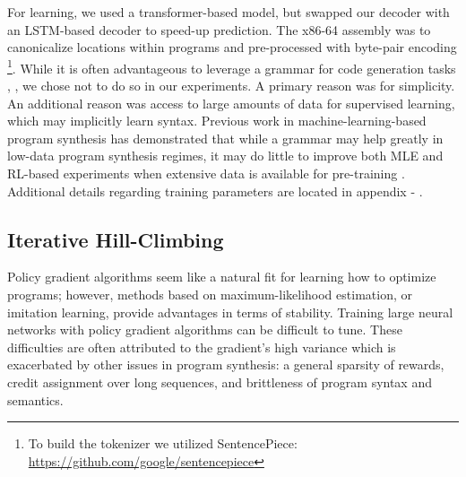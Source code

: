 \documentclass{article}
\begin{document}
For learning, we used a transformer-based model, but swapped our decoder with an LSTM-based decoder to speed-up prediction. 
The x86-64 assembly was to canonicalize locations within programs and pre-processed  with byte-pair encoding \citep{sennrich2015neural} \footnote{To build the tokenizer we utilized SentencePiece: \url{https://github.com/google/sentencepiece}}. 
While it is often advantageous to leverage a grammar for code generation tasks \cite{yin-neubig-2017-syntactic}, \cite{parisotto2016neuro}, we chose not to do so in our experiments. A primary reason was for simplicity. An additional reason was access to large amounts of data for supervised learning, which may implicitly learn syntax. Previous work in machine-learning-based program synthesis has demonstrated that while a grammar may help greatly in low-data program synthesis regimes, it may do little to improve both MLE and RL-based experiments when extensive data is available for pre-training \cite{bunel2018leveraging}. Additional details regarding training parameters are located in appendix - . 


\subsection{Iterative Hill-Climbing}

Policy gradient algorithms seem like a natural fit for learning how to optimize programs; however, methods based on maximum-likelihood estimation, or imitation learning, provide advantages in terms of stability. Training large neural networks with policy gradient algorithms can be difficult to tune. These difficulties are often attributed to the gradient's high variance which is exacerbated by other issues in program synthesis: a general sparsity of rewards, credit assignment over long sequences, and brittleness of program syntax and semantics. 
\end{document}
